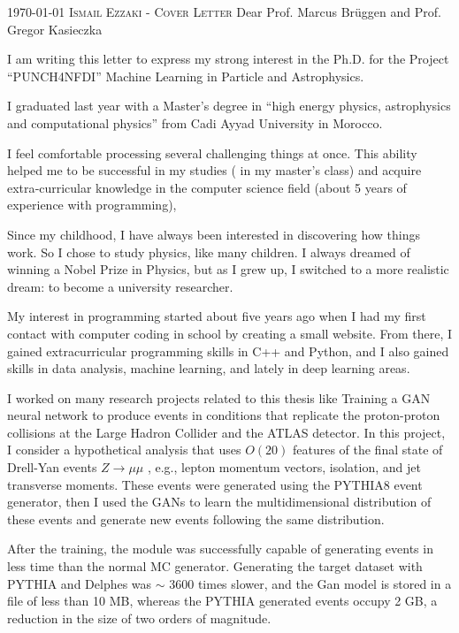 \documentclass[localFont,11pt,compact]{yaac-another-awesome-cv}
\begin{document}
	\makecvheader

	\makecvfooter
		{\textsc{\today}} %
		{\textsc{Ismail Ezzaki - Cover Letter}}
		{\thepage}
Dear Prof. Marcus Brüggen and Prof. Gregor Kasieczka  

  

I am writing this letter to express my strong interest in the Ph.D. for the Project “PUNCH4NFDI” Machine Learning in Particle and Astrophysics. 

  

I graduated last year with a Master’s degree in “high energy physics, astrophysics and computational physics” from Cadi Ayyad University in Morocco. 

  

I feel comfortable processing several challenging things at once. This ability helped me to be successful in my studies (    in my master's class) and acquire extra‐curricular knowledge in the computer science field (about 5 years of experience with programming), 

  

Since my childhood, I have always been interested in discovering how things work. So I chose to study physics, like many children. I always dreamed of winning a Nobel Prize in Physics, but as I grew up, I switched to a more realistic dream: to become a university researcher. 

  


My interest in programming started about five years ago when I had my first contact with computer coding in school by creating a small website. From there, I gained extracurricular programming skills in C++ and Python, and I also gained skills in data analysis, machine learning, and lately in deep learning areas. 


I worked on many research projects related to this thesis like Training a GAN neural network to produce events in conditions that replicate the proton-proton collisions at the Large Hadron Collider and the ATLAS detector. In this project, I consider a hypothetical analysis that uses $O(20)$ features of the final state of Drell-Yan events $Z \to \mu \mu$ , e.g., lepton momentum vectors, isolation, and jet transverse moments. These events were generated using the PYTHIA8 event generator, then I used the GANs to learn the multidimensional distribution of these events and generate new events following the same distribution. 

After the training, the module was successfully capable of generating events in less time than the normal MC generator. Generating the target dataset with PYTHIA and Delphes was $\sim$ 3600 times slower, and the Gan model is stored in a file of less than 10 MB, whereas the PYTHIA generated events occupy 2 GB, a reduction in the size of two orders of magnitude. 
\end{document}
